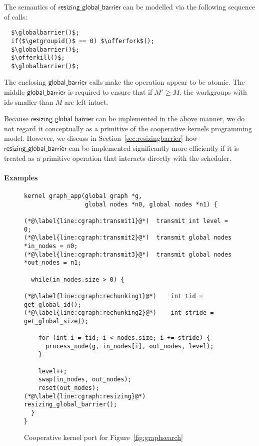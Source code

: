 \documentclass[nocopyrightspace,10pt]{sigplanconf}
\newcommand{\offerfork}{\mathsf{offer\_fork}}
\newcommand{\offerkill}{\mathsf{offer\_kill}}
\newcommand{\globalbarrier}{\mathsf{global\_barrier}}
\newcommand{\resizingglobalbarrier}{\mathsf{resizing\_global\_barrier}}
\newcommand{\getgroupid}{\mathsf{get\_group\_id}}
\begin{document}
The semantics of $\resizingglobalbarrier$ can be modelled via the following sequence of calls:

\lstset{basicstyle=\tt}
\begin{lstlisting}
  $\globalbarrier()$;
  if($\getgroupid()$ == 0) $\offerfork$();
  $\globalbarrier()$;
  $\offerkill()$;
  $\globalbarrier()$;
\end{lstlisting}
\lstset{basicstyle=\scriptsize\tt}

The enclosing $\globalbarrier$ calls make the operation appear to be
atomic.  The middle $\globalbarrier$ is required to ensure that if
$M'\geq M$, the workgroups with ids smaller than $M$ are left intact.

Because $\resizingglobalbarrier$ can be implemented in the above
manner, we do not regard it conceptually as a primitive of the
cooperative kernels programming model.  However, we discuss in
Section~\ref{sec:resizingbarrier} how $\resizingglobalbarrier$ can be
implemented significantly more efficiently if it is treated as a
primitive operation that interacts directly with the scheduler.

\paragraph{Examples}

\begin{figure}

\begin{lstlisting}
kernel graph_app(global graph *g, 
                 global nodes *n0, global nodes *n1) {

(*@\label{line:cgraph:transmit1}@*)  transmit int level = 0;
(*@\label{line:cgraph:transmit2}@*)  transmit global nodes *in_nodes = n0;
(*@\label{line:cgraph:transmit3}@*)  transmit global nodes *out_nodes = n1;

  while(in_nodes.size > 0) {

(*@\label{line:cgraph:rechunking1}@*)    int tid = get_global_id();
(*@\label{line:cgraph:rechunking2}@*)    int stride = get_global_size();

    for (int i = tid; i < nodes.size; i += stride) {
      process_node(g, in_nodes[i], out_nodes, level);
    }

    level++;
    swap(in_nodes, out_nodes);
    reset(out_nodes);
(*@\label{line:cgraph:resizing}@*)    resizing_global_barrier();
  }
}
\end{lstlisting}
\caption{Cooperative kernel port for Figure~\ref{fig:graphsearch}}\label{fig:cgraphsearch}
\end{figure}
\end{document}
